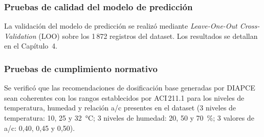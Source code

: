 \subsubsection*{Pruebas de calidad del modelo de predicción}

La validación del modelo de predicción se realizó mediante \textit{Leave-One-Out Cross-Validation} (LOO) sobre los 1\,872 registros del dataset. Los resultados se detallan en el Capítulo~4.

\subsubsection*{Pruebas de cumplimiento normativo}

Se verificó que las recomendaciones de dosificación base generadas por DIAPCE sean coherentes con los rangos establecidos por ACI\,211.1 para los niveles de temperatura, humedad y relación a/c presentes en el dataset (3 niveles de temperatura: 10, 25 y 32~°C; 3 niveles de humedad: 20, 50 y 70~\%; 3 valores de a/c: 0{,}40, 0{,}45 y 0{,}50).
